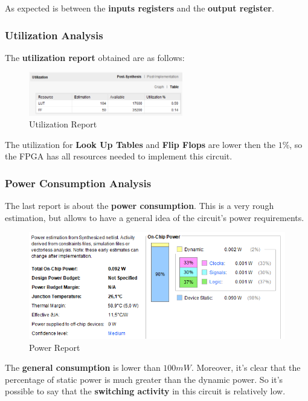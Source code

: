 As expected is between the \textbf{inputs registers} and the \textbf{output register}.

\subsubsection{Utilization Analysis}

The \textbf{utilization report} obtained are as follows:

\begin{figure}[H]
    \centering
    \includegraphics[width=0.6\textwidth]{img/Chapter5/SyntesisUtilization.png}
    \caption{Utilization Report}
    \label{fig:SU}
\end{figure}

The utilization for \textbf{Look Up Tables} and \textbf{Flip Flops} are lower then the $1\%$, so the FPGA has all resources needed to implement this circuit.

\subsubsection{Power Consumption Analysis}

The last report is about the \textbf{power consumption}. This is a very rough estimation, but allows to have a general idea of the circuit's power requirements.

\begin{figure}[H]
    \centering
    \includegraphics[width=1\textwidth]{img/Chapter5/SyntesisPower.png}
    \caption{Power Report}
    \label{fig:SPR}
\end{figure}

The \textbf{general consumption} is lower than  $100mW$. Moreover, it's clear that the percentage of static power is much greater than the dynamic power. So it's possible to say that the \textbf{switching activity} in this circuit is relatively low.


